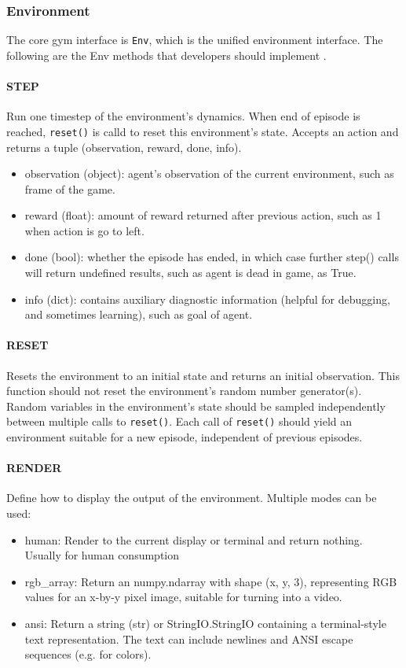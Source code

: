 \subsubsection{Environment}
The core gym interface is \texttt{Env}, which is the unified environment interface. The following are the Env methods that developers should implement \parencite{brockman2016openai}.

\paragraph{STEP} Run one timestep of the environment's dynamics. When end of episode is reached, \texttt{reset()} is calld to reset this environment's state. Accepts an action and returns a tuple (observation, reward, done, info).
\begin{itemize}
\item observation (object): agent's observation of the current environment, such as frame of the game.
\item reward (float): amount of reward returned after previous action, such as 1 when action is go to left.
\item done (bool): whether the episode has ended, in which case further step() calls will return undefined results, such as agent is dead in game, as True.
\item info (dict): contains auxiliary diagnostic information (helpful for debugging, and sometimes learning), such as goal of agent.
\end{itemize}

\paragraph{RESET} Resets the environment to an initial state and returns an initial observation. This function should not reset the environment's random number generator(s). Random variables in the environment's state should be sampled independently between multiple calls to \texttt{reset()}. Each call of \texttt{reset()} should yield an environment suitable for a new episode, independent of previous episodes.
\paragraph{RENDER} Define how to display the output of the environment. Multiple modes can be used: 
\begin{itemize}
	\item human: Render to the current display or terminal and return nothing. Usually for human consumption
	\item rgb\_array: Return an numpy.ndarray with shape (x, y, 3), representing RGB values for an x-by-y pixel image, suitable for turning into a video.
	\item ansi: Return a string (str) or StringIO.StringIO containing a terminal-style text representation. The text can include newlines and ANSI escape sequences (e.g. for colors).
\end{itemize}

